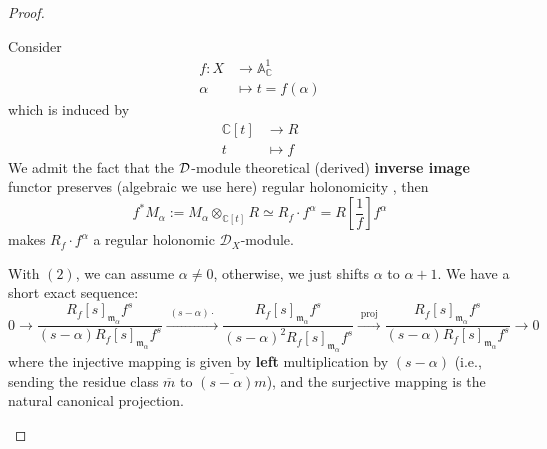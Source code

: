 \begin{proof}
\begin{enumerate}
              Consider
              \begin{align*}
                  f: X   & \longrightarrow \mathbb{A}^{1}_{\mathbb{C}} \\
                  \alpha & \longmapsto t=f(\alpha)
              \end{align*}
              which is induced by
              \begin{align*}
                  \mathbb{C}[t] & \longrightarrow R \\
                  t             & \longmapsto f
              \end{align*}
              We admit the fact that the $\mathcal{D}$-module theoretical (derived) \textbf{inverse image} functor \cite[Sect.~1.5, It is the derived one that comptible with Thm.~6.1.5]{hotta2008d} preserves (algebraic we use here) regular holonomicity \cite[Thm.~6.1.5]{hotta2008d}, then
              \[
                  f^{*} M_{\alpha}:=M_{\alpha}\otimes_{\mathbb{C}[t]} R\simeq R_{f}\cdot f^\alpha= R\left[\frac{1}{f}\right] f^{\alpha}
              \]
              makes $R_{f}\cdot f^\alpha$ a regular holonomic $\mathcal{D}_{X}$-module.

              With $(2)$, we can assume $\alpha\neq 0$, otherwise, we just shifts $\alpha$ to $\alpha+1$.
              We have a short exact sequence:
              \[
                  0 \longrightarrow \frac{R_f[s]_{\mathfrak{m}_{\alpha}} f^{s}}{(s-\alpha) R_f[s]_{\mathfrak{m}_{\alpha}} f^{s}} \xrightarrow{\;(s-\alpha)\cdot\;} \frac{R_f[s]_{\mathfrak{m}_{\alpha}} f^{s}}{(s-\alpha)^2 R_f[s]_{\mathfrak{m}_{\alpha}} f^{s}} \xrightarrow{\;\text{proj}\;} \frac{R_f[s]_{\mathfrak{m}_{\alpha}} f^{s}}{(s-\alpha) R_f[s]_{\mathfrak{m}_{\alpha}} f^{s}} \longrightarrow 0
              \]
              where the injective mapping is given by \textbf{left} multiplication by $(s-\alpha)$ (i.e., sending the residue class $\overline{m}$ to $\overline{(s-\alpha)m}$), and the surjective mapping is the natural canonical projection.


\end{enumerate}
\end{proof}
